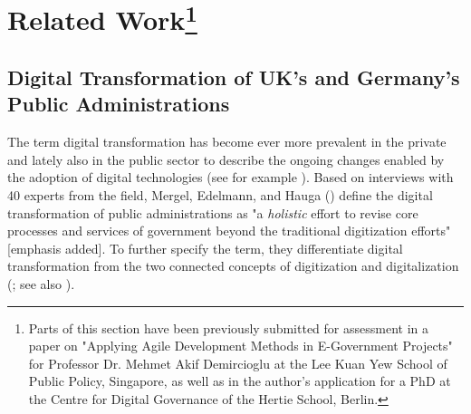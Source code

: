 \section[Related Work]{Related Work\footnote{Parts of this section have been previously submitted for assessment in a paper on "Applying Agile Development Methods in E-Government Projects" for Professor Dr. Mehmet Akif Demircioglu at the Lee Kuan Yew School of Public Policy, Singapore, as well as in the author's application for a PhD at the Centre for Digital Governance of the Hertie School, Berlin.}}
\subsection{Digital Transformation of UK's and Germany's Public Administrations}\label{Digital Transformation}
The term digital transformation has become ever more prevalent in the private and lately also in the public sector to describe the ongoing changes enabled by the adoption of digital technologies (see for example \cite{McKinsey2018,BehordenSpiegel2020,Tabrizi2019}). Based on interviews with 40 experts from the field, Mergel, Edelmann, and Hauga (\cite*[p. 12]{Mergel2019a}) define the digital transformation of public administrations as "a \textit{holistic} effort to revise core processes and services of government beyond the traditional digitization efforts" [emphasis added]. To further specify the term, they differentiate digital transformation from the two connected concepts of digitization and digitalization (\cite{Mergel2019a}; see also \cite{Bloomberg2018, Brennen2015}).\par 

